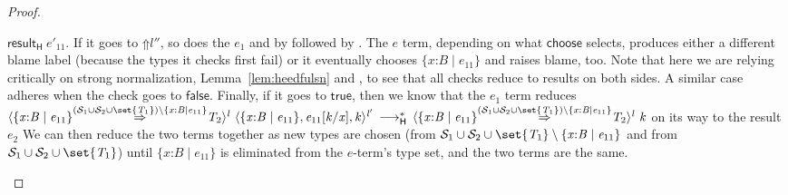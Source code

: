 \documentclass[9pt]{extarticle}
\newcommand{\ottnt}[1]{\mathit{#1}}
\newcommand{\ottsym}[1]{#1}
\begin{document}
{\begin{lemma}
\begin{proof}
{\begin{itemize}
      $ \mathsf{result} _{  \mathsf{H}  }~ \ottnt{e'_{{\mathrm{11}}}} $.
If it goes to $ \mathord{\Uparrow}  \ottnt{l''} $, so does the $\ottnt{e_{{\mathrm{1}}}}$ and
      by  followed by . 
The $\ottnt{e}$ term, depending on what $ \mathsf{choose} $ selects, 
      produces either a different blame label (because the types it
      checks first fail) or it eventually chooses $ \{ \mathit{x} \mathord{:} \ottnt{B} \mathrel{\mid} \ottnt{e_{{\mathrm{11}}}} \} $
      and raises blame, too. Note that here we are relying critically
      on strong normalization, Lemma~\ref{lem:heedfulsn} and
      , to see that all checks reduce to results on both
      sides.
A similar case adheres when the check goes to $ \mathsf{false} $.
Finally, if it goes to $ \mathsf{true} $, then we know that the $\ottnt{e_{{\mathrm{1}}}}$ term reduces
      $ \langle   \{ \mathit{x} \mathord{:} \ottnt{B} \mathrel{\mid} \ottnt{e_{{\mathrm{11}}}} \}   \mathord{ \overset{  \ottsym{(}    \mathcal{S}_{{\mathrm{1}}}  \cup  \mathcal{S}_{{\mathrm{2}}}   \cup   \set{  \ottnt{T_{{\mathrm{1}}}}  }    \ottsym{)}  \setminus   \{ \mathit{x} \mathord{:} \ottnt{B} \mathrel{\mid} \ottnt{e_{{\mathrm{11}}}} \}   }{\Rightarrow} }  \ottnt{T_{{\mathrm{2}}}}  \rangle^{ \ottnt{l} } ~   \langle   \{ \mathit{x} \mathord{:} \ottnt{B} \mathrel{\mid} \ottnt{e_{{\mathrm{11}}}} \}  ,   \ottnt{e_{{\mathrm{11}}}}  [  \ottnt{k} / \mathit{x}  ]  ,  \ottnt{k}  \rangle^{ \ottnt{l'} }   \,  \longrightarrow ^{*}_{  \mathsf{H}  }  \,  \langle   \{ \mathit{x} \mathord{:} \ottnt{B} \mathrel{\mid} \ottnt{e_{{\mathrm{11}}}} \}   \mathord{ \overset{  \ottsym{(}    \mathcal{S}_{{\mathrm{1}}}  \cup  \mathcal{S}_{{\mathrm{2}}}   \cup   \set{  \ottnt{T_{{\mathrm{1}}}}  }    \ottsym{)}  \setminus   \{ \mathit{x} \mathord{:} \ottnt{B} \mathrel{\mid} \ottnt{e_{{\mathrm{11}}}} \}   }{\Rightarrow} }  \ottnt{T_{{\mathrm{2}}}}  \rangle^{ \ottnt{l} } ~  \ottnt{k} $ on its way to the result $\ottnt{e_{{\mathrm{2}}}}$
We can then reduce the two terms together as new types are
      chosen (from $   \mathcal{S}_{{\mathrm{1}}}  \cup  \mathcal{S}_{{\mathrm{2}}}   \cup   \set{  \ottnt{T_{{\mathrm{1}}}}  }    \setminus   \{ \mathit{x} \mathord{:} \ottnt{B} \mathrel{\mid} \ottnt{e_{{\mathrm{11}}}} \}  $ and from $  \mathcal{S}_{{\mathrm{1}}}  \cup  \mathcal{S}_{{\mathrm{2}}}   \cup   \set{  \ottnt{T_{{\mathrm{1}}}}  }  $) until $ \{ \mathit{x} \mathord{:} \ottnt{B} \mathrel{\mid} \ottnt{e_{{\mathrm{11}}}} \} $ is eliminated from the
      $\ottnt{e}$-term's type set, and the two terms are the same.


\end{itemize}}
\end{proof}
\end{lemma}}
\end{document}
